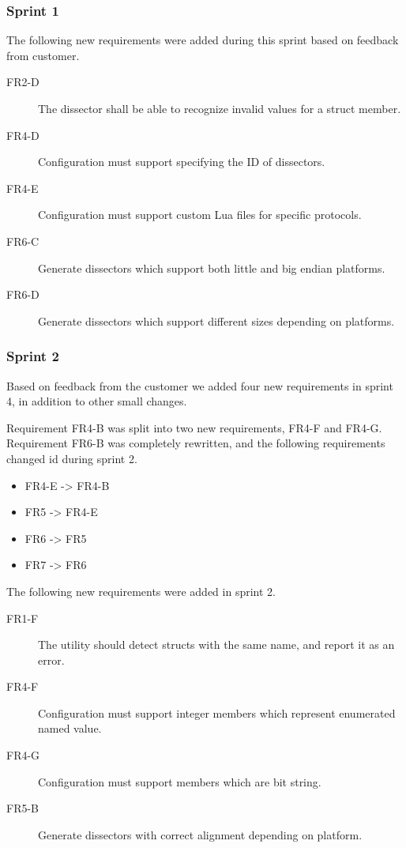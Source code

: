 \subsubsection{Sprint 1}
The following new requirements were added during this sprint based on feedback from customer.
\begin{description}
	\item[FR2-D] The dissector shall be able to recognize invalid values for a struct member.
	\item[FR4-D] Configuration must support specifying the ID of dissectors.
	\item[FR4-E] Configuration must support custom Lua files for specific protocols.
	\item[FR6-C] Generate dissectors which support both little and big endian platforms.
	\item[FR6-D] Generate dissectors which support different sizes depending on platforms.
\end{description}

\subsubsection{Sprint 2}
Based on feedback from the customer we added four new requirements in sprint 4,
in addition to other small changes.

Requirement FR4-B was split into two new requirements, FR4-F and FR4-G.
Requirement FR6-B was completely rewritten, and the following requirements
changed id during sprint 2.
\begin{itemize}
	\item FR4-E -> FR4-B
	\item FR5 -> FR4-E
	\item FR6 -> FR5
	\item FR7 -> FR6
\end{itemize}
The following new requirements were added in sprint 2.
\begin{description}
	\item[FR1-F] The utility should detect structs with the same name, and report it as an error.
	\item[FR4-F] Configuration must support integer members which represent enumerated named value.	
	\item[FR4-G] Configuration must support members which are bit string.
	\item[FR5-B] Generate dissectors with correct alignment depending on platform.
\end{description}

